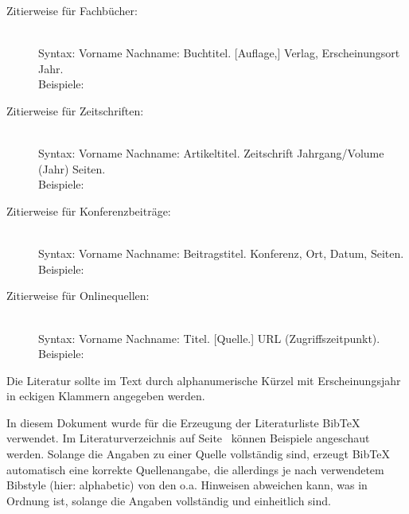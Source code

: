 \documentclass[
    fontsize=12pt,
    headings=small,
    parskip=half,           %
    bibliography=totoc,
    numbers=noenddot,       %
    open=any,               %
    ]{scrreprt}
\begin{document}
\begin{description}

	\item[Zitierweise für Fachbücher:] \mbox{}\\[1ex]
	Syntax: Vorname Nachname: Buchtitel. {[}Auflage,{]} Verlag, Erscheinungsort Jahr. \\[1ex]
	Beispiele: \cite{Beut2009,ScWe2007}

	\item[Zitierweise für Zeitschriften:] \mbox{}\\[1ex]
	Syntax: Vorname Nachname: Artikeltitel. Zeitschrift Jahrgang/Volume (Jahr) Seiten. \\[1ex]
	Beispiele: \cite{Kili2006,Lamp1981,ThKZ2002}

	\item[Zitierweise für Konferenzbeiträge:] \mbox{}\\[1ex]
	Syntax: Vorname Nachname: Beitragstitel. Konferenz, Ort, Datum, Seiten. \\[1ex]
	Beispiele: \cite{InBr2009,WWPK2010,HSFN2009}

	\item[Zitierweise für Onlinequellen:] \mbox{}\\[1ex]
	Syntax: Vorname Nachname: Titel. {[}Quelle.{]} URL (Zugriffszeitpunkt). \\[1ex]
	Beispiele: \cite{CCC2009,Heise2011,textwahrnehmung}

\end{description}

Die Literatur sollte im Text durch alphanumerische Kürzel mit Erscheinungsjahr in eckigen Klammern angegeben werden.
%

In diesem Dokument wurde für die Erzeugung der Literaturliste BibTeX verwendet. Im Literaturverzeichnis auf Seite~\pageref{sec:literaturverzeichnis} können Beispiele angeschaut werden. Solange die Angaben zu einer Quelle vollständig sind, erzeugt BibTeX automatisch eine korrekte Quellenangabe, die allerdings je nach verwendetem Bibstyle (hier: alphabetic) von den o.a. Hinweisen abweichen kann, was in Ordnung ist, solange die Angaben vollständig und einheitlich sind.
\end{document}
